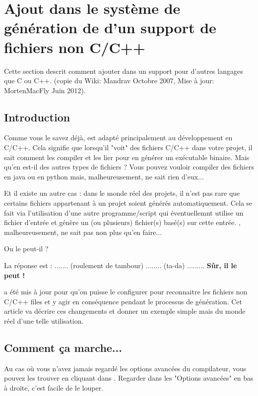 \section{Ajout dans le système de génération de \codeblocks d'un support de fichiers non C/C++}\label{sec:cb_AddLanguage}

Cette section descrit comment ajouter dans \codeblocks un support pour d'autres langages que C ou C++. (copie du Wiki: Mandrav Octobre 2007, Mise à jour: MortenMacFly Juin 2012).

\subsection{Introduction}
Comme vous le savez déjà, \codeblocks est adapté principalement au développement en C/C++. Cela signifie que lorsqu'il "voit"  des fichiers C/C++ dans votre projet, il sait comment les compiler et les lier pour en générer un exécutable binaire. Mais qu'en est-il des autres types de fichiers ? Vous pouvez vouloir compiler des fichiers en java ou en python mais, malheureusement, \codeblocks ne sait rien d'eux...\

Et il existe un autre cas : dans le monde réel des projets, il n'est pas rare que certains fichiers appartenant à un projet soient générés automatiquement. Cela se fait via l'utilisation d'une autre programme/script qui éventuellemnt utilise un fichier d'entrée et génère un (ou plusieurs) fichier(s) basé(s) sur cette entrée. \codeblocks, malheureusement, ne sait pas non plus qu'en faire...\

Ou le peut-il ?\

La réponse est : ....... (roulement de tambour) ........ (ta-da) ......... \textbf{Sûr, il le peut !}\

\codeblocks a été mis à jour pour qu'on puisse le configurer pour reconnaitre les fichiers non C/C++ files et y agir en conséquence pendant le processus de génération. Cet article va décrire ces changements et donner un exemple simple mais du monde réel d'une telle utilisation. 

\subsection{Comment ça marche...}

Au cas où vous n'avez jamais regardé les options avancées du compilateur, vous pouvez les trouver en cliquant dans . Regarder dans les "Options avancées" en bas à droite, c'est facile de le louper.\

